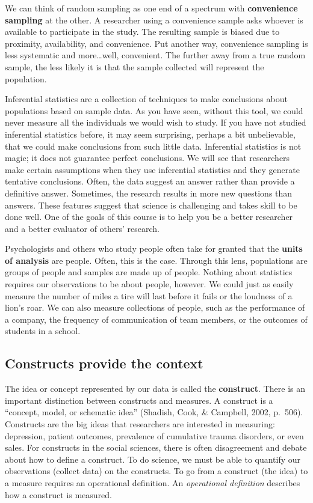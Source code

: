 \documentclass[
]{book}
\begin{document}
We can think of random sampling as one end of a spectrum with \textbf{convenience sampling} at the other. A researcher using a convenience sample asks whoever is available to participate in the study. The resulting sample is biased due to proximity, availability, and convenience. Put another way, convenience sampling is less systematic and more\ldots well, convenient. The further away from a true random sample, the less likely it is that the sample collected will represent the population.

Inferential statistics are a collection of techniques to make conclusions about populations based on sample data. As you have seen, without this tool, we could never measure all the individuals we would wish to study. If you have not studied inferential statistics before, it may seem surprising, perhaps a bit unbelievable, that we could make conclusions from such little data. Inferential statistics is not magic; it does not guarantee perfect conclusions. We will see that researchers make certain assumptions when they use inferential statistics and they generate tentative conclusions. Often, the data suggest an answer rather than provide a definitive answer. Sometimes, the research results in more new questions than answers. These features suggest that science is challenging and takes skill to be done well. One of the goals of this course is to help you be a better researcher and a better evaluator of others' research.

Psychologists and others who study people often take for granted that the \textbf{units of analysis} are people. Often, this is the case. Through this lens, populations are groups of people and samples are made up of people. Nothing about statistics requires our observations to be about people, however. We could just as easily measure the number of miles a tire will last before it fails or the loudness of a lion's roar. We can also measure collections of people, such as the performance of a company, the frequency of communication of team members, or the outcomes of students in a school.

\hypertarget{constructs-provide-the-context}{%
\subsection{Constructs provide the context}\label{constructs-provide-the-context}}

The idea or concept represented by our data is called the \textbf{construct}. There is an important distinction between constructs and measures. A construct is a ``concept, model, or schematic idea'' (Shadish, Cook, \& Campbell, 2002, p.~506). Constructs are the big ideas that researchers are interested in measuring: depression, patient outcomes, prevalence of cumulative trauma disorders, or even sales. For constructs in the social sciences, there is often disagreement and debate about how to define a construct. To do science, we must be able to quantify our observations (collect data) on the constructs. To go from a construct (the idea) to a measure requires an operational definition. An \emph{operational definition} describes how a construct is measured.
\end{document}
